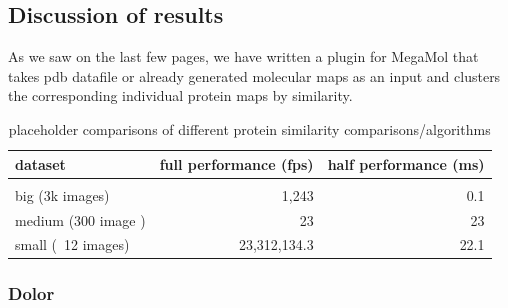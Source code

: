 \documentclass[journal]{vgtc}       %
\begin{document}
\subsection{Discussion of results}
As we saw on the last few pages, we have written a plugin for MegaMol that takes pdb datafile or already generated molecular maps as an input and clusters  the corresponding individual protein maps by similarity.

\begin{table}
  \caption{
  \label{tab:perf} placeholder comparisons of different protein similarity comparisons/algorithms}
  \centering
  \vspace{0.3em}
  \begin{tabular}{lrr}
  dataset & full performance (fps) & half performance (ms)\\ \hline\\[-0.4em]
  big (3k images) & 1,243 & 0.1 \\
  medium (300 image ) & 23 & 23 \\
  small (~12 images) & 23,312,134.3 & 22.1 \\
  \end{tabular}
  \end{table}


\subsubsection{Dolor}








\end{document}
